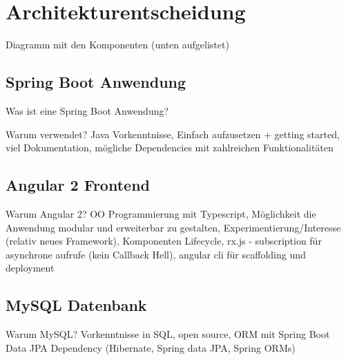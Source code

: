 \section{Architekturentscheidung}
Diagramm mit den Komponenten (unten aufgelistet)

\subsection{Spring Boot Anwendung}
Was ist eine Spring Boot Anwendung?

Warum verwendet? Java Vorkenntnisse, Einfach aufzusetzen + getting started, viel Dokumentation, mögliche Dependencies mit zahlreichen Funktionalitäten

\subsection{Angular 2 Frontend}
Warum Angular 2? OO Programmierung mit Typescript, Möglichkeit die Anwendung modular und erweiterbar zu gestalten, Experimentierung/Interesse (relativ neues Framework), Komponenten Lifecycle, rx.js - subscription für asynchrone aufrufe (kein Callback Hell), angular cli für scaffolding und deployment

\subsection{MySQL Datenbank}
Warum MySQL? Vorkenntnisse in SQL, open source, ORM mit Spring Boot Data JPA Dependency (Hibernate, Spring data JPA, Spring ORMs)